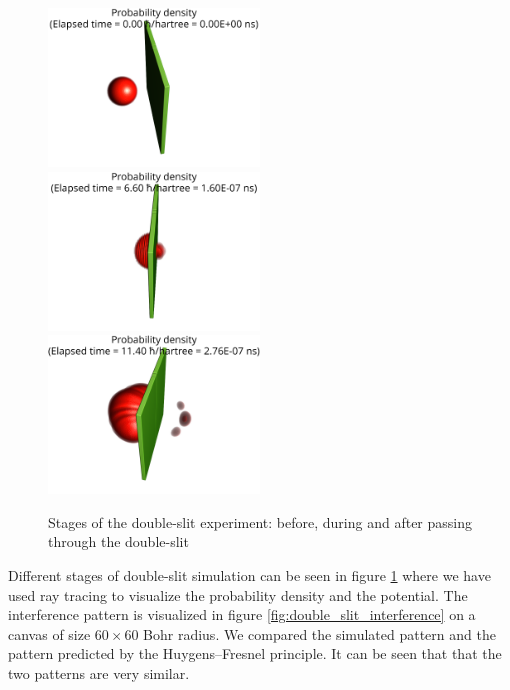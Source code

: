 \begin{figure}
	\begin{center}
		\includegraphics[width=0.5\textwidth]{figures/double_slit_01.png}
		\includegraphics[width=0.5\textwidth]{figures/double_slit_02.png}
		\includegraphics[width=0.5\textwidth]{figures/double_slit_03.png}
		\caption{Stages of the double-slit experiment: before, during and after passing through the double-slit}
		\label{fig:double_slit_stages}
	\end{center}
\end{figure}
Different stages of double-slit simulation can be seen in figure \ref{fig:double_slit_stages} where we have used ray tracing to visualize the probability density and the potential.
The interference pattern is visualized in figure \ref{fig:double_slit_interference} on a canvas of size $60 \times 60$ Bohr radius.
We compared the simulated pattern and the pattern predicted by the Huygens–Fresnel principle.
It can be seen that that the two patterns are very similar.
